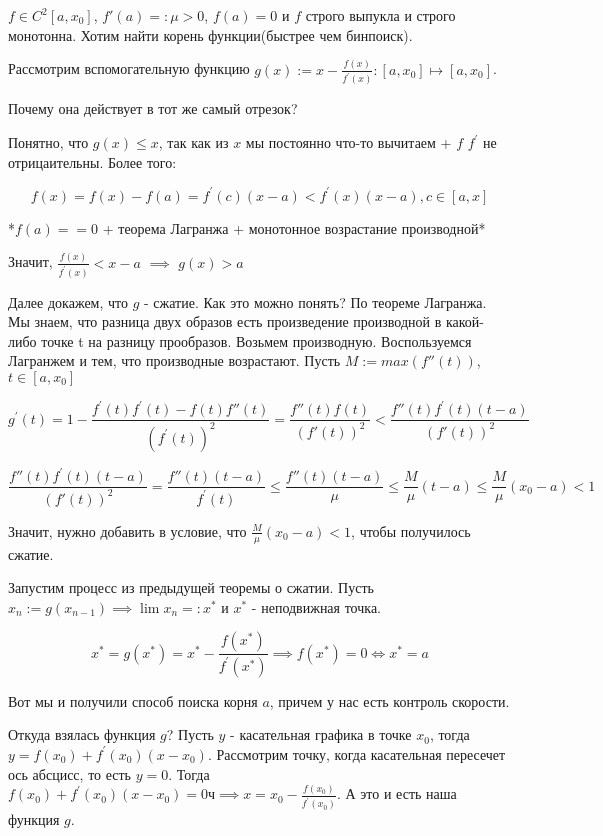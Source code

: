 \begin{example} \thmslashn
	
	$f \in C^2[a, x_0]$, $f'(a) =: \mu > 0$, $f(a) = 0$ и $f$ строго выпукла и строго монотонна. Хотим найти корень функции(быстрее чем бинпоиск).
	
	Рассмотрим вспомогательную функцию $g(x) := x - \frac{f(x)}{f^\prime(x)} : [a, x_0] \mapsto [a, x_0]$.
	
	Почему она действует в тот же самый отрезок?
	
	Понятно, что $g(x) \le x$, так как из $x$ мы постоянно что-то вычитаем + $f$ $f^\prime$ не отрицаительны. Более того:
	
	\[
	f(x) = f(x) - f(a) = f^\prime(c)(x - a) < f^\prime(x)(x - a), c \in [a, x]
	\]
	
	*$f(a) == 0$ + теорема Лагранжа + монотонное возрастание производной*
	
	Значит, $\frac{f(x)}{f^\prime(x)} < x - a$ $\implies$ $g(x) > a$
	
	Далее докажем, что $g$ - сжатие. Как это можно понять? По теореме Лагранжа. Мы знаем, что разница двух образов есть произведение производной в какой-либо точке t на разницу прообразов. Возьмем производную. Воспользуемся Лагранжем и тем, что производные возрастают. Пусть $M := max(f''(t))$, $t \in [a, x_0]$
	
	
	\[
	g^\prime(t) = 
	1 - \frac{f^\prime(t)f^\prime(t) - f(t) f''(t)}{(f^\prime(t))^2}
	=
	\frac{f''(t) f(t)}{(f'(t))^2} 
	<
	\frac{f''(t) f^\prime(t)(t  - a)}{(f'(t))^2}
	\]
	
	\[
	\frac{f''(t) f^\prime(t)(t  - a)}{(f'(t))^2}
	=
	\frac{f''(t)(t-a)}{f^{\prime}(t)} \le
	\frac{f''(t)(t-a)}{\mu}
	\le
	\frac{M}{\mu}(t-a)
	\le
	\frac{M}{\mu}(x_0-a)
	< 1
	\]
	
	Значит, нужно добавить в условие, что $\frac{M}{\mu}(x_0 - a) < 1$, чтобы получилось сжатие.
	
	Запустим процесс из предыдущей теоремы о сжатии. Пусть $x_n := g(x_{n - 1}) \implies \lim x_n = :x^*$ и $x^*$ - неподвижная точка.
	
	\[
	x^* = g(x^*) = x^* - \frac{f(x^*)}{f^\prime(x^*)} \implies f(x^*) = 0 \iff x^* = a
	\]
	
	Вот мы и получили способ поиска корня $a$, причем у нас есть контроль скорости.
	
\end{example}

\begin{remark} \thmslashn
	
	Откуда взялась функция $g$? Пусть $y$ - касательная графика в точке $x_0$, тогда $y = f(x_0) + f^\prime(x_0)(x - x_0)$. Рассмотрим точку, когда касательная пересечет ось абсцисс, то есть $y = 0$. Тогда  $f(x_0) + f^\prime(x_0)(x - x_0) = 0ч	 \implies x = x_0 - \frac{f(x_0)}{f^\prime(x_0)}$. А это и есть наша функция $g$.
\end{remark}
